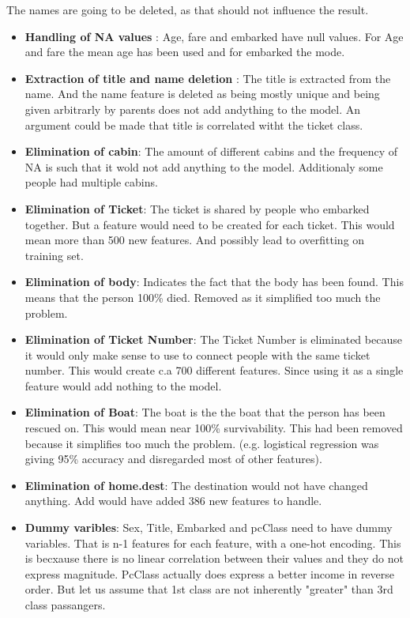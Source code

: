 \documentclass{article}
\begin{document}
The names are going to be deleted, as that should not influence the result.

\begin{itemize}
\item \textbf{Handling of NA values} : Age, fare and embarked have null values. For Age and fare the mean age has been used and for embarked the mode.
\item \textbf{Extraction of title and name deletion} : The title is extracted from the name. And the name feature is deleted as being mostly unique and being given arbitrarly by parents does not add andything to the model. An argument could be made that title is correlated witht the ticket class.  
\item \textbf{Elimination of cabin}: The amount of different cabins and the frequency of NA is such that it wold not add anything to the model. Additionaly some people had multiple cabins.
\item \textbf{Elimination of Ticket}: The ticket is shared by people who embarked together. But a feature would need to be created for each ticket. This would mean more than 500 new features. And possibly lead to overfitting on training set. 
\item \textbf{Elimination of body}: Indicates the fact that the body has been found. This means that the person 100\% died. Removed as it simplified too much the problem. 
\item  \textbf{Elimination of Ticket Number}: The Ticket Number is eliminated because it would only make sense to use to connect people with the same ticket number. This would create c.a 700 different features. Since using it as a single feature would add nothing to the model.
\item \textbf{Elimination of Boat}: The boat is the the boat that the person has been rescued on. This would mean near 100\% survivability. This had been removed because it simplifies too much the problem. (e.g. logistical regression was giving  95\% accuracy and disregarded most of other features).
\item \textbf{Elimination of home.dest}: The destination would not have changed anything. Add would have added 386 new features to handle.
\item \textbf{Dummy varibles}: Sex, Title, Embarked and pcClass need to have dummy variables. That is n-1 features for each feature, with a one-hot encoding. This is becxause there is no linear correlation between their values and they do not express magnitude. PcClass actually does express a better income in reverse order. But let us assume that 1st class are not inherently "greater" than 3rd class passangers.
\end{itemize}
\end{document}
